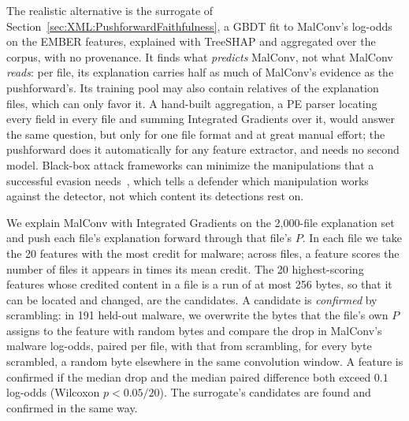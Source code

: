 The realistic alternative is the surrogate of Section~\ref{sec:XML:PushforwardFaithfulness}, a GBDT fit to MalConv's
log-odds on the EMBER features, explained with TreeSHAP and aggregated over the corpus, with no provenance. It finds
what \emph{predicts} MalConv, not what MalConv \emph{reads}: per file, its explanation carries half as much of MalConv's
evidence as the pushforward's. Its training pool may also
contain relatives of the explanation files, which can only favor it. A hand-built aggregation, a PE parser locating
every field in every file and summing Integrated Gradients over it, would answer the same question, but only for one
file format and at great manual effort; the pushforward does it automatically for any feature extractor, and needs no
second model. Black-box attack frameworks can minimize the manipulations that a successful evasion
needs~\cite{song2022mab}, which tells a defender which manipulation works against the detector, not which content its
detections rest on.

We explain MalConv with Integrated Gradients on the 2{,}000-file explanation set and push each file's explanation
forward through that file's $P$. In each file we take the 20 features with the most credit for malware; across files, a
feature scores the number of files it appears in times its mean credit. The 20 highest-scoring features whose credited
content in a file is a run of at most 256 bytes, so that it can be located and changed, are the candidates. A
candidate is \emph{confirmed} by scrambling: in 191 held-out malware, we overwrite the bytes that the file's own $P$
assigns to the feature with random bytes and compare the drop in MalConv's malware log-odds, paired per file, with that
from scrambling, for every byte scrambled, a random byte elsewhere in the same convolution window. A feature is confirmed if the median drop
and the median paired difference both exceed $0.1$ log-odds (Wilcoxon $p < 0.05/20$). The surrogate's candidates are
found and confirmed in the same way.

